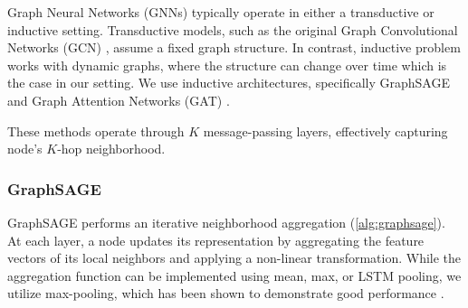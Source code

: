 \documentclass{article}
\theoremstyle{plain}
\theoremstyle{definition}
\theoremstyle{remark}
\begin{document}
Graph Neural Networks (GNNs) typically operate in either a transductive or inductive setting. Transductive models, such as the original Graph Convolutional Networks (GCN) \cite{gcn}, assume a fixed graph structure. In contrast,  inductive problem works with dynamic graphs, where the structure can change over time which is the case in our setting. We use inductive architectures, specifically GraphSAGE \cite{sage} and Graph Attention Networks (GAT) \cite{gat}.

These methods operate through $K$ message-passing layers, effectively capturing node's $K$-hop neighborhood.

\subsubsection{GraphSAGE}

GraphSAGE performs an iterative neighborhood aggregation (\cref{alg:graphsage}). At each layer, a node updates its representation by aggregating the feature vectors of its local neighbors and applying a non-linear transformation. While the aggregation function can be implemented using mean, max, or LSTM pooling, we utilize max-pooling, which has been shown to demonstrate good performance \cite{sage}.
\end{document}

